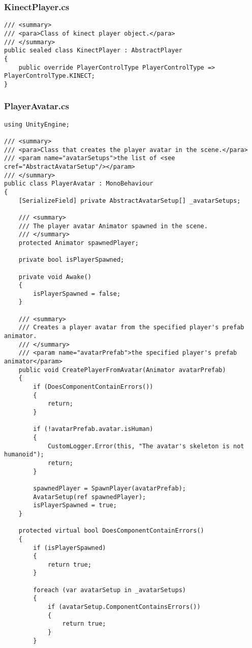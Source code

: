 \subsubsection*{KinectPlayer.cs}
\begin{verbatim}
/// <summary>
/// <para>Class of kinect player object.</para>
/// </summary>
public sealed class KinectPlayer : AbstractPlayer
{
    public override PlayerControlType PlayerControlType => PlayerControlType.KINECT;
}
\end{verbatim}
\subsubsection*{PlayerAvatar.cs}
\begin{verbatim}
using UnityEngine;

/// <summary>
/// <para>Class that creates the player avatar in the scene.</para>
/// <param name="avatarSetups">the list of <see cref="AbstractAvatarSetup"/></param>
/// </summary>
public class PlayerAvatar : MonoBehaviour
{
    [SerializeField] private AbstractAvatarSetup[] _avatarSetups;

    /// <summary>
    /// The player avatar Animator spawned in the scene.
    /// </summary>
    protected Animator spawnedPlayer;

    private bool isPlayerSpawned;

    private void Awake()
    {
        isPlayerSpawned = false;
    }

    /// <summary>
    /// Creates a player avatar from the specified player's prefab animator.
    /// </summary>
    /// <param name="avatarPrefab">the specified player's prefab animator</param>
    public void CreatePlayerFromAvatar(Animator avatarPrefab)
    {
        if (DoesComponentContainErrors())
        {
            return;
        }

        if (!avatarPrefab.avatar.isHuman)
        {
            CustomLogger.Error(this, "The avatar's skeleton is not humanoid");
            return;
        }

        spawnedPlayer = SpawnPlayer(avatarPrefab);
        AvatarSetup(ref spawnedPlayer);
        isPlayerSpawned = true;
    }

    protected virtual bool DoesComponentContainErrors()
    {
        if (isPlayerSpawned)
        {
            return true;
        }

        foreach (var avatarSetup in _avatarSetups)
        {
            if (avatarSetup.ComponentContainsErrors())
            {
                return true;
            }
        }


\end{verbatim}
